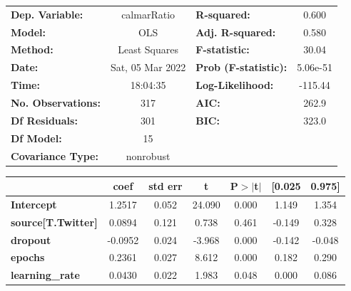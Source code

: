 \begin{center}
\begin{tabular}{lclc}
\toprule
\textbf{Dep. Variable:}              &   calmarRatio    & \textbf{  R-squared:         } &     0.600   \\
\textbf{Model:}                      &       OLS        & \textbf{  Adj. R-squared:    } &     0.580   \\
\textbf{Method:}                     &  Least Squares   & \textbf{  F-statistic:       } &     30.04   \\
\textbf{Date:}                       & Sat, 05 Mar 2022 & \textbf{  Prob (F-statistic):} &  5.06e-51   \\
\textbf{Time:}                       &     18:04:35     & \textbf{  Log-Likelihood:    } &   -115.44   \\
\textbf{No. Observations:}           &         317      & \textbf{  AIC:               } &     262.9   \\
\textbf{Df Residuals:}               &         301      & \textbf{  BIC:               } &     323.0   \\
\textbf{Df Model:}                   &          15      & \textbf{                     } &             \\
\textbf{Covariance Type:}            &    nonrobust     & \textbf{                     } &             \\
\bottomrule
\end{tabular}
\begin{tabular}{lcccccc}
                                     & \textbf{coef} & \textbf{std err} & \textbf{t} & \textbf{P$> |$t$|$} & \textbf{[0.025} & \textbf{0.975]}  \\
\midrule
\textbf{Intercept}                   &       1.2517  &        0.052     &    24.090  &         0.000        &        1.149    &        1.354     \\
\textbf{source[T.Twitter]}           &       0.0894  &        0.121     &     0.738  &         0.461        &       -0.149    &        0.328     \\
\textbf{dropout}                     &      -0.0952  &        0.024     &    -3.968  &         0.000        &       -0.142    &       -0.048     \\
\textbf{epochs}                      &       0.2361  &        0.027     &     8.612  &         0.000        &        0.182    &        0.290     \\
\textbf{learning\_rate}              &       0.0430  &        0.022     &     1.983  &         0.048        &        0.000    &        0.086     \\

\end{tabular}
\end{center}
